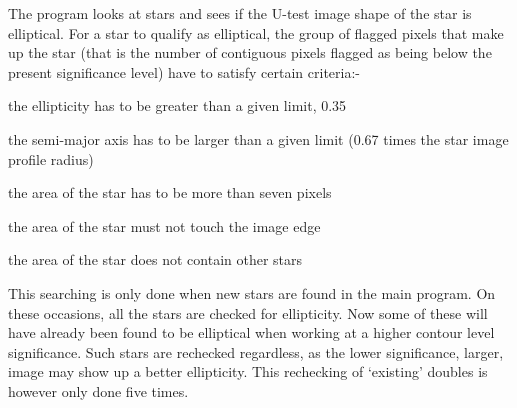 {{ The program looks at stars and sees if the U-test image shape of the
 star is elliptical. For a star to qualify as elliptical, the
 group of flagged pixels that make up the star (that is the number 
 of contiguous pixels flagged as being below the present 
 significance level) have to satisfy certain criteria:-

\begin{list}{{-}}{}

    \item  the ellipticity has to be greater than a given limit, 0.35
    \item  the semi-major axis has to be larger than a given limit 
              (0.67 times the star image profile radius)
    \item  the area of the star has to be more than seven pixels
    \item  the area of the star must not touch the image edge 
    \item  the area of the star does not contain other stars
\end{list}

 This searching is only done when new stars are found in the main
 program. On these occasions, all the stars are checked for
 ellipticity. Now some of these will have already been found
 to be elliptical when working at a higher contour level
 significance. Such stars are rechecked regardless, as the lower
 significance, larger, image may show up a better ellipticity. This
 rechecking of `existing' doubles is however only done five times.

}}
